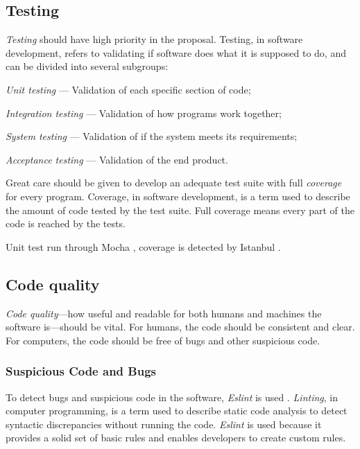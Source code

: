 \subsection{Testing}\label{testing}

\emph{Testing} should have high priority in the proposal.
Testing, in software development, refers to validating if software does what
  it is supposed to do, and can be divided into several subgroups:

\begin{aenumerate}
\item\emph{Unit testing} --- Validation of each specific section of code;
\item\emph{Integration testing} --- Validation of how programs work together;
\item\emph{System testing} --- Validation of if the system meets its
  requirements;
\item\emph{Acceptance testing} --- Validation of the end product.
\end{aenumerate}

\noindent Great care should be given to develop an adequate test suite with
  full \emph{coverage} for every program.
Coverage, in software development, is a term used to describe the amount of
  code tested by the test suite.
Full coverage means every part of the code is reached by the tests.

Unit test run through Mocha \autocite{visionmedia/mocha-source-code},
  coverage is detected by Istanbul
  \autocite{gotwarlost/istanbul-source-code}.

\subsection{Code quality}\label{code-quality}

\emph{Code quality}---how useful and readable for both humans and machines
  the software is---should be vital. For humans, the code should be
  consistent and clear. For computers, the code should be free of bugs and
  other suspicious code.

\subsubsection{Suspicious Code and Bugs}\label{suspicious-code-and-bugs}

To detect bugs and suspicious code in the software, \emph{Eslint}
  is used \autocite{eslint/eslint-source-code}.
\emph{Linting}, in computer programming, is a term used to describe static
  code analysis to detect syntactic discrepancies without running the code.
\emph{Eslint} is used because it provides a solid set of basic rules and
  enables developers to create custom rules.

